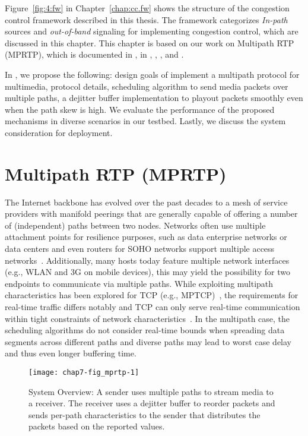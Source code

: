 Figure~\ref{fig:4:fw} in Chapter~\ref{chap:cc.fw} shows the structure of the
congestion control framework described in this thesis. The framework
categorizes \emph{In-path} sources and \emph{out-of-band} signaling for
implementing congestion control, which are discussed in this chapter. This
chapter is based on our work on Multipath RTP (MPRTP), which is documented in
, in \cite{draft.mprtp}, \cite{draft.mprtp.sdp},
\cite{Globisch:AsymGrpComm}, and \cite{draft.rtcp.overlay}.

In , we propose the following: design goals of implement a
multipath protocol for multimedia, protocol details, scheduling algorithm to
send media packets over multiple paths, a dejitter buffer implementation to
playout packets smoothly even when the path skew is high. We evaluate the
performance of the proposed mechanisms in diverse scenarios in our testbed.
Lastly, we discuss the system consideration for deployment.

\section{Multipath RTP (MPRTP)}

The Internet backbone has evolved over the past decades to a mesh of service
providers with manifold peerings that are generally capable of offering a
number of (independent) paths between two nodes. Networks often use multiple
attachment points for resilience purposes, such as data enterprise networks or
data centers and even routers for SOHO networks support multiple access
networks~\cite{draft.fun.multi, draft.homenet.arch}. Additionally, many hosts
today feature multiple network interfaces (e.g., WLAN and 3G on mobile
devices), this may yield the possibility for two endpoints to communicate via
multiple paths. While exploiting multipath characteristics
\cite{Wischik:2008:RPP} has been explored for TCP (e.g.,
MPTCP)~\cite{rfc6824}, the requirements for real-time traffic differs notably
and TCP can only serve real-time communication within tight constraints of
network characteristics~\cite{Brosh:tcp-real-time}. In the multipath case, the
scheduling algorithms do not consider real-time bounds when spreading data
segments across different paths and diverse paths may lead to worst case delay
and thus even longer buffering time.

\begin{figure}
\centerline {
\texttt{[image: chap7-fig\_mprtp-1]}
}
\caption{System Overview: A sender uses multiple paths to stream media
  to a receiver.  The receiver uses a dejitter buffer to reorder
  packets and sends per-path characteristics to the sender that
  distributes the packets based on the reported values.}
\label{chap7:fig_mprtp}
\end{figure}

